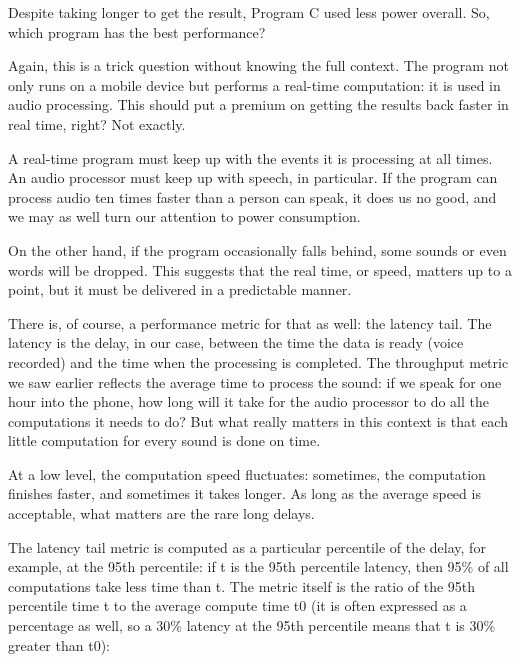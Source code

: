 Despite taking longer to get the result, Program C used less power overall. So, which program has the best performance? 

Again, this is a trick question without knowing the full context. The program not only runs on a mobile device but performs a real-time computation: it is used in audio processing. This should put a premium on getting the results back faster in real time, right? Not exactly.


A real-time program must keep up with the events it is processing at all times. An audio processor must keep up with speech, in particular. If the program can process audio ten times faster than a person can speak, it does us no good, and we may as well turn our attention to power consumption.

On the other hand, if the program occasionally falls behind, some sounds or even words will be dropped. This suggests that the real time, or speed, matters up to a point, but it must be delivered in a predictable manner.

There is, of course, a performance metric for that as well: the latency tail. The latency is the delay, in our case, between the time the data is ready (voice recorded) and the time when the processing is completed. The throughput metric we saw earlier reflects the average time to process the sound: if we speak for one hour into the phone, how long will it take for the audio processor to do all the computations it needs to do? But what really matters in this context is that each little computation for every sound is done on time. 

At a low level, the computation speed fluctuates: sometimes, the computation finishes faster, and sometimes it takes longer. As long as the average speed is acceptable, what matters are the rare long delays.

The latency tail metric is computed as a particular percentile of the delay, for example, at the 95th percentile: if t is the 95th percentile latency, then 95\% of all computations take less time than t. The metric itself is the ratio of the 95th percentile time t to the average compute time t0 (it is often expressed as a percentage as well, so a 30\% latency at the 95th percentile means that t is 30\% greater than t0):


